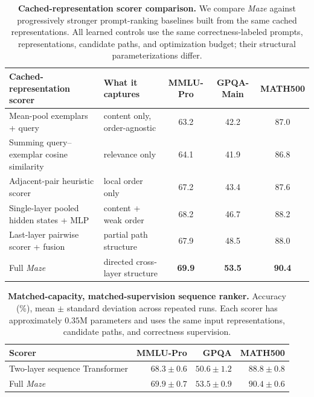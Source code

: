 \begin{table}[htbp]
\caption{
{\bf Cached-representation scorer comparison.}
We compare \emph{Maze} against progressively stronger prompt-ranking baselines built from the same cached representations.
All learned controls use the same correctness-labeled prompts, representations, candidate paths, and optimization budget; their structural parameterizations differ.
}
\label{tab:ranker_ablation_main}
\centering
\small
\begin{tabular}{@{}>{\raggedright\arraybackslash}p{4.0cm}>{\raggedright\arraybackslash}p{3.5cm}ccc@{}}
\toprule
Cached-representation scorer & What it captures & MMLU-Pro & GPQA-Main & MATH500 \\ \midrule
Mean-pool exemplars + query & content only, order-agnostic & 63.2 & 42.2 & 87.0 \\
Summing query--exemplar cosine similarity & relevance only & 64.1 & 41.9 & 86.8 \\
Adjacent-pair heuristic scorer & local order only & 67.2 & 43.4 & 87.6 \\
Single-layer pooled hidden states + MLP & content + weak order & 68.2 & 46.7 & 88.2 \\
Last-layer pairwise scorer + fusion & partial path structure & 67.9 & 48.5 & 88.0 \\ \midrule
Full \emph{Maze} & directed cross-layer structure & \textbf{69.9} & \textbf{53.5} & \textbf{90.4} \\
\bottomrule
\end{tabular}
\end{table}

\begin{table}[htbp]
\centering
\caption{\textbf{Matched-capacity, matched-supervision sequence ranker.}
Accuracy (\%), mean $\pm$ standard deviation across repeated runs.
Each scorer has approximately $0.35$M parameters and uses the same input representations, candidate paths, and correctness supervision.}
\label{tab:sequence-ranker}
\small
\begin{tabular}{@{}lrrr@{}}
\toprule
Scorer & MMLU-Pro & GPQA & MATH500\\
\midrule
Two-layer sequence Transformer & $68.3\pm0.6$ & $50.6\pm1.2$ & $88.8\pm0.8$\\
Full \emph{Maze} & $69.9\pm0.7$ & $53.5\pm0.9$ & $90.4\pm0.6$\\
\bottomrule
\end{tabular}
\end{table}

